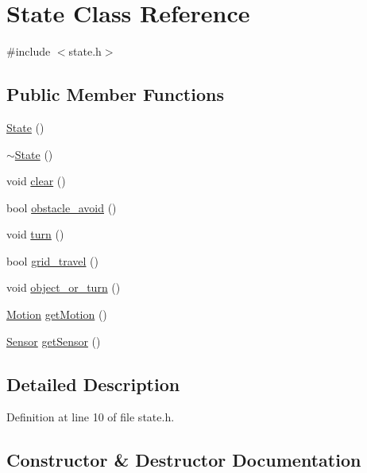 \hypertarget{class_state}{}\section{State Class Reference}
\label{class_state}


{\ttfamily \#include $<$state.\+h$>$}

\subsection*{Public Member Functions}
\begin{DoxyCompactItemize}
\item 
\mbox{\hyperlink{class_state_ab91bb1dd5aa6260ab2a456581daf9ec2}{State}} ()
\item 
\mbox{\hyperlink{class_state_afab438d92b90dc18d194dbd9c9c8bab3}{$\sim$\+State}} ()
\item 
void \mbox{\hyperlink{class_state_aed3bf8334ee32e0cccba11fc2dc42b68}{clear}} ()
\item 
bool \mbox{\hyperlink{class_state_a975afaa8e6091654888d7ed58b8c29c1}{obstacle\+\_\+avoid}} ()
\item 
void \mbox{\hyperlink{class_state_ae5ed95e28512e11f7cc41c603ca58ad5}{turn}} ()
\item 
bool \mbox{\hyperlink{class_state_a4e9d67c11218113bfa282ddccfd6326a}{grid\+\_\+travel}} ()
\item 
void \mbox{\hyperlink{class_state_ae03eae00675106f8b6b9481c4b0e50dc}{object\+\_\+or\+\_\+turn}} ()
\item 
\mbox{\hyperlink{class_motion}{Motion}} \mbox{\hyperlink{class_state_adcabc610335b5bd9efdf7f908de7dacb}{get\+Motion}} ()
\item 
\mbox{\hyperlink{class_sensor}{Sensor}} \mbox{\hyperlink{class_state_a9195abef447816fe4830f875f0b1dda2}{get\+Sensor}} ()
\end{DoxyCompactItemize}


\subsection{Detailed Description}


Definition at line 10 of file state.\+h.



\subsection{Constructor \& Destructor Documentation}
\mbox{\label{class_state_ab91bb1dd5aa6260ab2a456581daf9ec2}} 
